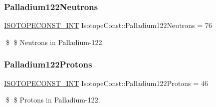 \subsubsection{\texorpdfstring{Palladium122\+Neutrons}{Palladium122Neutrons}}
{\footnotesize\ttfamily \mbox{\hyperlink{group___isotope_const-_macros_ga5f18360b3e99483a35c32d789e62621c}{I\+S\+O\+T\+O\+P\+E\+C\+O\+N\+S\+T\+\_\+\+I\+NT}} Isotope\+Const\+::\+Palladium122\+Neutrons = 76}

\$ \$ Neutrons in Palladium-\/122. \mbox{\label{group___isotope_const-_palladium-_pd122_ga20470d8b9891f7cfc9646a0a2ce9a1d1}} 
\subsubsection{\texorpdfstring{Palladium122\+Protons}{Palladium122Protons}}
{\footnotesize\ttfamily \mbox{\hyperlink{group___isotope_const-_macros_ga5f18360b3e99483a35c32d789e62621c}{I\+S\+O\+T\+O\+P\+E\+C\+O\+N\+S\+T\+\_\+\+I\+NT}} Isotope\+Const\+::\+Palladium122\+Protons = 46}

\$ \$ Protons in Palladium-\/122. 
